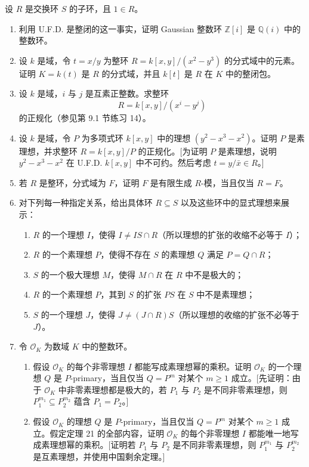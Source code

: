 设 $R$ 是交换环 $S$ 的子环，且 $1\in R$。

\begin{enumerate}[label=\arabic*.]
	\item 利用 U.F.D. 是整闭的这一事实，证明 Gaussian 整数环 $\mathbb Z[i]$ 是 $\mathbb Q(i)$ 中的整数环。
	\item 设 $k$ 是域，令 $t=x/y$ 为整环 $R=k[x,y]/(x^2-y^3)$ 的分式域中的元素。证明 $K=k(t)$ 是 $R$ 的分式域，并且 $k[t]$ 是 $R$ 在 $K$ 中的整闭包。
	\item 设 $k$ 是域，$i$ 与 $j$ 是互素正整数。求整环
	\[
	R=k[x,y]/(x^i-y^j)
	\]
	的正规化（参见第 9.1 节练习 14）。
	\item 设 $k$ 是域，令 $P$ 为多项式环 $k[x,y]$ 中的理想 $(y^2-x^3-x^2)$。证明 $P$ 是素理想，并求整环 $R=k[x,y]/P$ 的正规化。[为证明 $P$ 是素理想，说明 $y^2-x^3-x^2$ 在 U.F.D. $k[x,y]$ 中不可约。然后考虑 $t=y/\bar x\in R$。]
	\item 若 $R$ 是整环，分式域为 $F$，证明 $F$ 是有限生成 $R$-模，当且仅当 $R=F$。
	\item 对下列每一种指定关系，给出具体环 $R\subseteq S$ 以及这些环中的显式理想来展示：
	\begin{enumerate}[label=(\alph*)]
		\item $R$ 的一个理想 $I$，使得 $I\ne IS\cap R$（所以理想的扩张的收缩不必等于 $I$）；
		\item $R$ 的一个素理想 $P$，使得不存在 $S$ 的素理想 $Q$ 满足 $P=Q\cap R$；
		\item $S$ 的一个极大理想 $M$，使得 $M\cap R$ 在 $R$ 中不是极大的；
		\item $R$ 的一个素理想 $P$，其到 $S$ 的扩张 $PS$ 在 $S$ 中不是素理想；
		\item $S$ 的一个理想 $J$，使得 $J\ne (J\cap R)S$（所以理想的收缩的扩张不必等于 $J$）。
	\end{enumerate}
	\item 令 $\mathcal O_K$ 为数域 $K$ 中的整数环。
	\begin{enumerate}[label=(\alph*)]
		\item 假设 $\mathcal O_K$ 的每个非零理想 $I$ 都能写成素理想幂的乘积。证明 $\mathcal O_K$ 的一个理想 $Q$ 是 $P$-primary，当且仅当 $Q=P^m$ 对某个 $m\ge1$ 成立。[先证明：由于 $\mathcal O_K$ 中非零素理想都是极大的，若 $P_1$ 与 $P_2$ 是不同非零素理想，则 $P_1^{m_1}\subseteq P_2^{m_2}$ 蕴含 $P_1=P_2$。]
		\item 假设 $\mathcal O_K$ 的理想 $Q$ 是 $P$-primary，当且仅当 $Q=P^m$ 对某个 $m\ge1$ 成立。假定定理 21 的全部内容，证明 $\mathcal O_K$ 的每个非零理想 $I$ 都能唯一地写成素理想幂的乘积。[证明若 $P_1$ 与 $P_2$ 是不同非零素理想，则 $P_1^{m_1}$ 与 $P_2^{m_2}$ 是互素理想，并使用中国剩余定理。]

\end{enumerate}
\end{enumerate}
